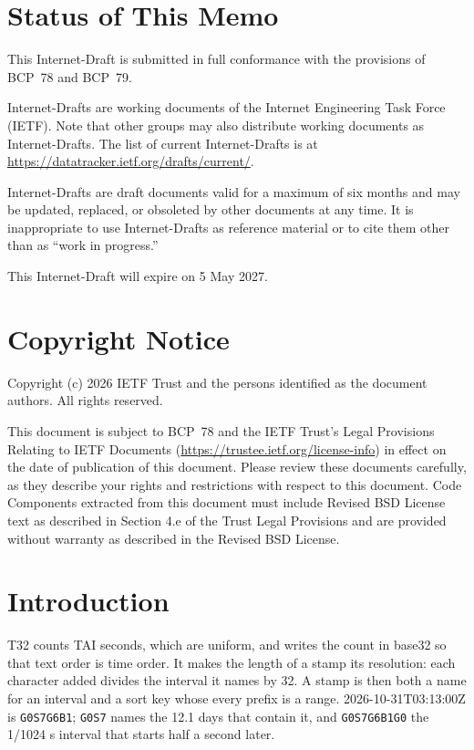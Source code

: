 \documentclass[11pt]{article}
\newcommand{\expires}{5 May 2027} %
\newcommand{\lit}[1]{\texttt{#1}}
\begin{document}
\section*{Status of This Memo}

This Internet-Draft is submitted in full conformance with the provisions of
BCP~78 and BCP~79.

Internet-Drafts are working documents of the Internet Engineering Task Force
(IETF). Note that other groups may also distribute working documents as
Internet-Drafts. The list of current Internet-Drafts is at
\url{https://datatracker.ietf.org/drafts/current/}.

Internet-Drafts are draft documents valid for a maximum of six months and may
be updated, replaced, or obsoleted by other documents at any time. It is
inappropriate to use Internet-Drafts as reference material or to cite them
other than as ``work in progress.''

This Internet-Draft will expire on \expires.

\section*{Copyright Notice}

Copyright (c) 2026 IETF Trust and the persons identified as the document
authors. All rights reserved.

This document is subject to BCP~78 and the IETF Trust's Legal Provisions
Relating to IETF Documents (\url{https://trustee.ietf.org/license-info}) in
effect on the date of publication of this document. Please review these
documents carefully, as they describe your rights and restrictions with
respect to this document. Code Components extracted from this document must
include Revised BSD License text as described in Section 4.e of the Trust
Legal Provisions and are provided without warranty as described in the
Revised BSD License.

\clearpage
\tableofcontents
\clearpage


\section{Introduction}\label{sec:intro}

T32 counts TAI seconds, which are uniform, and writes the count in base32 so
that text order is time order. It makes the length of a stamp its resolution:
each character added divides the interval it names by 32. A stamp is then
both a name for an interval and a sort key whose every prefix is a range.
2026-10-31T03:13:00Z is \lit{G0S7G6B1}; \lit{G0S7} names the 12.1 days that
contain it, and \lit{G0S7G6B1G0} the 1/1024 s interval that starts half a
second later.
\end{document}
